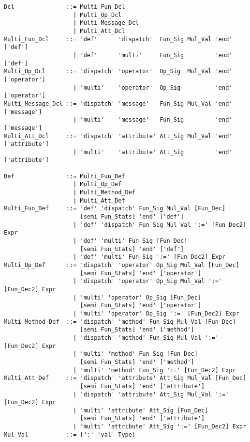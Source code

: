\syntax\begin{lstlisting}
Dcl               ::= Multi_Fun_Dcl
                    | Multi_Op_Dcl
                    | Multi_Message_Dcl
                    | Multi_Att_Dcl
Multi_Fun_Dcl     ::= 'def'      'dispatch'  Fun_Sig Mul_Val 'end' ['def']
                    | 'def'      'multi'     Fun_Sig         'end' ['def']
Multi_Op_Dcl      ::= 'dispatch' 'operator'  Op_Sig  Mul_Val 'end' ['operator']
                    | 'multi'    'operator'  Op_Sig          'end' ['operator']
Multi_Message_Dcl ::= 'dispatch' 'message'   Fun_Sig Mul_Val 'end' ['message']
                    | 'multi'    'message'   Fun_Sig         'end' ['message']
Multi_Att_Dcl     ::= 'dispatch' 'attribute' Att_Sig Mul_Val 'end' ['attribute']
                    | 'multi'    'attribute' Att_Sig         'end' ['attribute']

Def               ::= Multi_Fun_Def
                    | Multi_Op_Def
                    | Multi_Method_Def
                    | Multi_Att_Def
Multi_Fun_Def     ::= 'def' 'dispatch' Fun_Sig Mul_Val [Fun_Dec] 
                      [semi Fun_Stats] 'end' ['def']
                    | 'def' 'dispatch' Fun_Sig Mul_Val ':=' [Fun_Dec2] Expr
                    | 'def' 'multi' Fun_Sig [Fun_Dec] 
                      [semi Fun_Stats] 'end' ['def']
                    | 'def' 'multi' Fun_Sig ':=' [Fun_Dec2] Expr
Multi_Op_Def      ::= 'dispatch' 'operator' Op_Sig Mul_Val [Fun_Dec] 
                      [semi Fun_Stats] 'end' ['operator']
                    | 'dispatch' 'operator' Op_Sig Mul_Val ':=' [Fun_Dec2] Expr
                    | 'multi' 'operator' Op_Sig [Fun_Dec] 
                      [semi Fun_Stats] 'end' ['operator']
                    | 'multi' 'operator' Op_Sig ':=' [Fun_Dec2] Expr
Multi_Method_Def  ::= 'dispatch' 'method' Fun_Sig Mul_Val [Fun_Dec] 
                      [semi Fun_Stats] 'end' ['method']
                    | 'dispatch' 'method' Fun_Sig Mul_Val ':=' [Fun_Dec2] Expr
                    | 'multi' 'method' Fun_Sig [Fun_Dec] 
                      [semi Fun_Stats] 'end' ['method']
                    | 'multi' 'method' Fun_Sig ':=' [Fun_Dec2] Expr
Multi_Att_Def     ::= 'dispatch' 'attribute' Att_Sig Mul_Val [Fun_Dec] 
                      [semi Fun_Stats] 'end' ['attribute']
                    | 'dispatch' 'attribute' Att_Sig Mul_Val ':=' [Fun_Dec2] Expr
                    | 'multi' 'attribute' Att_Sig [Fun_Dec] 
                      [semi Fun_Stats] 'end' ['attribute']
                    | 'multi' 'attribute' Att_Sig ':=' [Fun_Dec2] Expr 
Mul_Val           ::= [':' 'val' Type]
\end{lstlisting}

